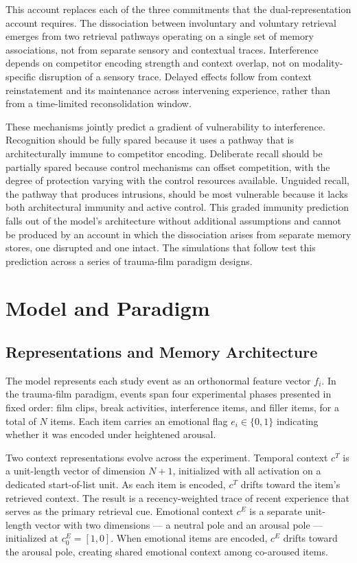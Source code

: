 \documentclass[
  man,
  floatsintext,
  longtable,
  nolmodern,
  notxfonts,
  notimes,
  draftfirst,
  colorlinks=true,linkcolor=blue,citecolor=blue,urlcolor=blue]{apa7}
\begin{document}
This account replaces each of the three commitments that the
dual-representation account requires. The dissociation between
involuntary and voluntary retrieval emerges from two retrieval pathways
operating on a single set of memory associations, not from separate
sensory and contextual traces. Interference depends on competitor
encoding strength and context overlap, not on modality-specific
disruption of a sensory trace. Delayed effects follow from context
reinstatement and its maintenance across intervening experience, rather
than from a time-limited reconsolidation window.

These mechanisms jointly predict a gradient of vulnerability to
interference. Recognition should be fully spared because it uses a
pathway that is architecturally immune to competitor encoding.
Deliberate recall should be partially spared because control mechanisms
can offset competition, with the degree of protection varying with the
control resources available. Unguided recall, the pathway that produces
intrusions, should be most vulnerable because it lacks both
architectural immunity and active control. This graded immunity
prediction falls out of the model's architecture without additional
assumptions and cannot be produced by an account in which the
dissociation arises from separate memory stores, one disrupted and one
intact. The simulations that follow test this prediction across a series
of trauma-film paradigm designs.

\section{Model and Paradigm}\label{model-and-paradigm}

\subsection{Representations and Memory
Architecture}\label{representations-and-memory-architecture}

The model represents each study event as an orthonormal feature vector
\(f_i\). In the trauma-film paradigm, events span four experimental
phases presented in fixed order: film clips, break activities,
interference items, and filler items, for a total of \(N\) items. Each
item carries an emotional flag \(e_i \in \{0, 1\}\) indicating whether
it was encoded under heightened arousal.

Two context representations evolve across the experiment. Temporal
context \(c^T\) is a unit-length vector of dimension \(N + 1\),
initialized with all activation on a dedicated start-of-list unit. As
each item is encoded, \(c^T\) drifts toward the item's retrieved
context. The result is a recency-weighted trace of recent experience
that serves as the primary retrieval cue. Emotional context \(c^E\) is a
separate unit-length vector with two dimensions --- a neutral pole and
an arousal pole --- initialized at \(c^E_0 = [1, 0]\). When emotional
items are encoded, \(c^E\) drifts toward the arousal pole, creating
shared emotional context among co-aroused items.
\end{document}
